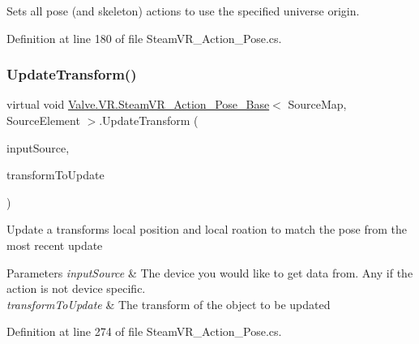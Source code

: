 Sets all pose (and skeleton) actions to use the specified universe origin. 



Definition at line 180 of file Steam\+V\+R\+\_\+\+Action\+\_\+\+Pose.\+cs.

\mbox{\label{class_valve_1_1_v_r_1_1_steam_v_r___action___pose___base_a95ffd5217a271d75ca471c9ccdf36215}} 
\subsubsection{\texorpdfstring{UpdateTransform()}{UpdateTransform()}}
{\footnotesize\ttfamily virtual void \mbox{\hyperlink{class_valve_1_1_v_r_1_1_steam_v_r___action___pose___base}{Valve.\+V\+R.\+Steam\+V\+R\+\_\+\+Action\+\_\+\+Pose\+\_\+\+Base}}$<$ Source\+Map, Source\+Element $>$.Update\+Transform (\begin{DoxyParamCaption}\item[{\mbox{\hyperlink{namespace_valve_1_1_v_r_a82e5bf501cc3aa155444ee3f0662853f}{Steam\+V\+R\+\_\+\+Input\+\_\+\+Sources}}}]{input\+Source,  }\item[{Transform}]{transform\+To\+Update }\end{DoxyParamCaption})\hspace{0.3cm}{\ttfamily [virtual]}}



Update a transform\textquotesingle{}s local position and local roation to match the pose from the most recent update 


\begin{DoxyParams}{Parameters}
{\em input\+Source} & The device you would like to get data from. Any if the action is not device specific.\\
\hline
{\em transform\+To\+Update} & The transform of the object to be updated\\
\hline
\end{DoxyParams}


Definition at line 274 of file Steam\+V\+R\+\_\+\+Action\+\_\+\+Pose.\+cs.

\mbox{\label{class_valve_1_1_v_r_1_1_steam_v_r___action___pose___base_ad1269e7f3b8399dfe46e7fd85f8ed481}} 
